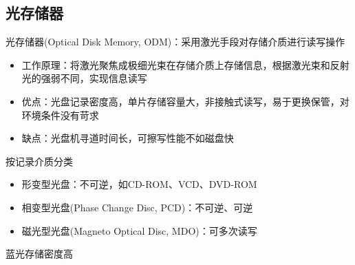 \subsection{光存储器}
光存储器(Optical Disk Memory, ODM)：采用激光手段对存储介质进行读写操作
\begin{itemize}
	\item 工作原理：将激光聚焦成极细光束在存储介质上存储信息，根据激光束和反射光的强弱不同，实现信息读写
	\item 优点：光盘记录密度高，单片存储容量大，非接触式读写，易于更换保管，对环境条件没有苛求
	\item 缺点：光盘机寻道时间长，可擦写性能不如磁盘快
\end{itemize}
按记录介质分类
\begin{itemize}
	\item 形变型光盘：不可逆，如CD-ROM、VCD、DVD-ROM
	\item 相变型光盘(Phase Change Disc, PCD)：不可逆、可逆
	\item 磁光型光盘(Magneto Optical Disc, MDO)：可多次读写
\end{itemize}
蓝光存储密度高

